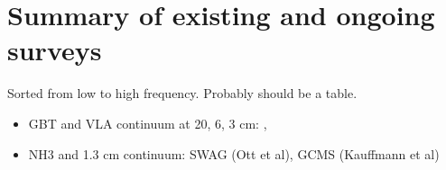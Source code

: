 \section{Summary of existing and ongoing surveys}
Sorted from low to high frequency.  Probably should be a table.

\begin{itemize}
    \item GBT and VLA continuum at 20, 6, 3 cm: \citet{Law2008a}, \citet{Law2008b}
    \item NH3 and 1.3 cm continuum: SWAG (Ott et al), GCMS (Kauffmann et al)
    
\end{itemize}